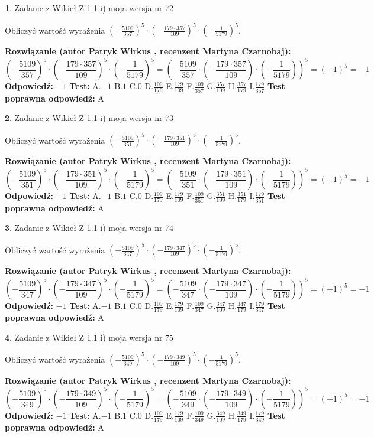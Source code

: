 \documentclass[12pt, a4paper]{article}
\theoremstyle{definition} %
\newtheorem{zad}{}
\newcommand{\zadStart}[1]{\begin{zad}#1\newline}
\newcommand{\zadStop}{\end{zad}}
\newcommand{\rozwStart}[2]{\noindent \textbf{Rozwiązanie (autor #1 , recenzent #2): }\newline}
\newcommand{\rozwStop}{\newline}
\newcommand{\odpStart}{\noindent \textbf{Odpowiedź:}\newline}
\newcommand{\odpStop}{\newline}
\newcommand{\testStart}{\noindent \textbf{Test:}\newline}
\newcommand{\testStop}{\newline}
\newcommand{\kluczStart}{\noindent \textbf{Test poprawna odpowiedź:}\newline}
\newcommand{\kluczStop}{\newline}
\begin{document}
\zadStart{Zadanie z Wikieł Z 1.1 i) moja wersja nr 72}

Obliczyć wartość wyrażenia $(-\frac{5109}{357})^{5} \cdot (-\frac{179 \cdot 357}{109})^{5} \cdot (-\frac{1}{5179})^{5}$.
\zadStop
\rozwStart{Patryk Wirkus}{Martyna Czarnobaj}
$$(-\frac{5109}{357})^{5} \cdot (-\frac{179 \cdot 357}{109})^{5} \cdot (-\frac{1}{5179})^{5} = (-\frac{5109}{357} \cdot (-\frac{179 \cdot 357}{109}) \cdot (-\frac{1}{5179}))^{5} = (-1)^{5} = -1$$
\rozwStop
\odpStart
$-1$
\odpStop
\testStart
A.$-1$ B.$1$ C.$0$ D.$\frac{109}{179}$ E.$\frac{179}{109}$
F.$\frac{109}{357}$ G.$\frac{357}{109}$
H.$\frac{357}{179}$
I.$\frac{179}{357}$
\testStop
\kluczStart
A
\kluczStop



\zadStart{Zadanie z Wikieł Z 1.1 i) moja wersja nr 73}

Obliczyć wartość wyrażenia $(-\frac{5109}{351})^{5} \cdot (-\frac{179 \cdot 351}{109})^{5} \cdot (-\frac{1}{5179})^{5}$.
\zadStop
\rozwStart{Patryk Wirkus}{Martyna Czarnobaj}
$$(-\frac{5109}{351})^{5} \cdot (-\frac{179 \cdot 351}{109})^{5} \cdot (-\frac{1}{5179})^{5} = (-\frac{5109}{351} \cdot (-\frac{179 \cdot 351}{109}) \cdot (-\frac{1}{5179}))^{5} = (-1)^{5} = -1$$
\rozwStop
\odpStart
$-1$
\odpStop
\testStart
A.$-1$ B.$1$ C.$0$ D.$\frac{109}{179}$ E.$\frac{179}{109}$
F.$\frac{109}{351}$ G.$\frac{351}{109}$
H.$\frac{351}{179}$
I.$\frac{179}{351}$
\testStop
\kluczStart
A
\kluczStop



\zadStart{Zadanie z Wikieł Z 1.1 i) moja wersja nr 74}

Obliczyć wartość wyrażenia $(-\frac{5109}{347})^{5} \cdot (-\frac{179 \cdot 347}{109})^{5} \cdot (-\frac{1}{5179})^{5}$.
\zadStop
\rozwStart{Patryk Wirkus}{Martyna Czarnobaj}
$$(-\frac{5109}{347})^{5} \cdot (-\frac{179 \cdot 347}{109})^{5} \cdot (-\frac{1}{5179})^{5} = (-\frac{5109}{347} \cdot (-\frac{179 \cdot 347}{109}) \cdot (-\frac{1}{5179}))^{5} = (-1)^{5} = -1$$
\rozwStop
\odpStart
$-1$
\odpStop
\testStart
A.$-1$ B.$1$ C.$0$ D.$\frac{109}{179}$ E.$\frac{179}{109}$
F.$\frac{109}{347}$ G.$\frac{347}{109}$
H.$\frac{347}{179}$
I.$\frac{179}{347}$
\testStop
\kluczStart
A
\kluczStop



\zadStart{Zadanie z Wikieł Z 1.1 i) moja wersja nr 75}

Obliczyć wartość wyrażenia $(-\frac{5109}{349})^{5} \cdot (-\frac{179 \cdot 349}{109})^{5} \cdot (-\frac{1}{5179})^{5}$.
\zadStop
\rozwStart{Patryk Wirkus}{Martyna Czarnobaj}
$$(-\frac{5109}{349})^{5} \cdot (-\frac{179 \cdot 349}{109})^{5} \cdot (-\frac{1}{5179})^{5} = (-\frac{5109}{349} \cdot (-\frac{179 \cdot 349}{109}) \cdot (-\frac{1}{5179}))^{5} = (-1)^{5} = -1$$
\rozwStop
\odpStart
$-1$
\odpStop
\testStart
A.$-1$ B.$1$ C.$0$ D.$\frac{109}{179}$ E.$\frac{179}{109}$
F.$\frac{109}{349}$ G.$\frac{349}{109}$
H.$\frac{349}{179}$
I.$\frac{179}{349}$
\testStop
\kluczStart
A
\kluczStop
\end{document}

